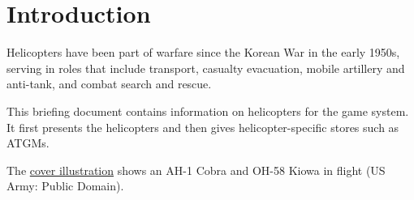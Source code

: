 
\chapter{Introduction}

Helicopters have been part of warfare since the Korean War in the early 1950s, serving in roles that include transport, casualty evacuation, mobile artillery and anti-tank, and combat search and rescue.

This briefing document contains information on helicopters for the {\AirPow} game system. It first presents the helicopters and then gives helicopter-specific stores such as ATGMs.

The \href{https://commons.wikimedia.org/wiki/File:Cobra_and_Kiowa_DF-ST-86-10445.JPEG}{cover illustration} shows an AH-1 Cobra and OH-58 Kiowa in flight (US Army: Public Domain).

\setcounter{tocdepth}{2}
\tableofcontents
\listoftables